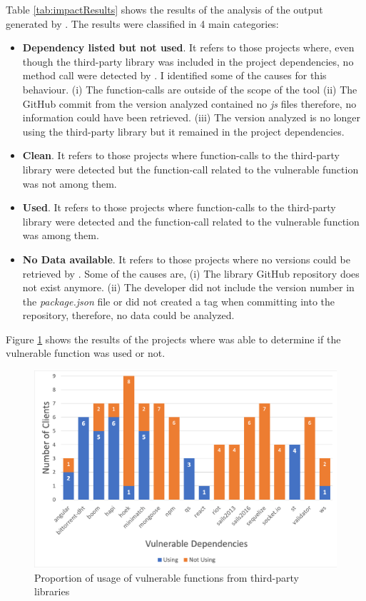 Table \ref{tab:impactResults} shows the results of the analysis of the output generated by \tool[]. The results were classified in 4 main categories:
\begin{itemize}
    \item \textbf{Dependency listed but not used}. It refers to those projects where, even though the third-party library was included in the project dependencies, no method call were detected by \tool[]. I identified some of the causes for this behaviour. (i) The function-calls are outside of the scope of the tool (ii) The GitHub commit from the version analyzed contained no \textit{js} files therefore, no information could have been retrieved. (iii) The version analyzed is no longer using the third-party library but it remained in the project dependencies. 
    
    \item \textbf{Clean}. It refers to those projects where function-calls to the third-party library were detected but the function-call related to the vulnerable function was not among them.
    
    \item \textbf{Used}. It refers to those projects where function-calls to the third-party library were detected and the function-call related to the vulnerable function was among them.
    
    \item \textbf{No Data available}. It refers to those projects where no versions could be retrieved by \tool[]. Some of the causes are, (i) The library GitHub repository does not exist anymore. (ii) The developer did not include the version number in the \textit{package.json} file or did not created a tag when committing into the repository, therefore, no data could be analyzed. 
\end{itemize}

Figure \ref{fig:impactResults} shows the results of the projects where \tool[] was able to determine if the vulnerable function was used or not.

\begin{figure}[ht]
\centering
\includegraphics[width=1\textwidth]{images/impact_results.png}
\caption{Proportion of usage of vulnerable functions from third-party libraries}
\label{fig:impactResults}
\end{figure}

